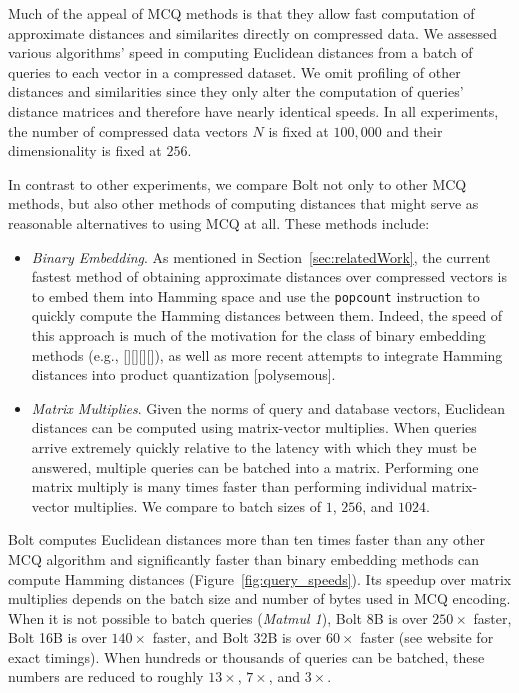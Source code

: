 Much of the appeal of MCQ methods is that they allow fast computation of approximate distances and similarites directly on compressed data. We assessed various algorithms' speed in computing Euclidean distances from a batch of queries to each vector in a compressed dataset. We omit profiling of other distances and similarities since they only alter the computation of queries' distance matrices and therefore have nearly identical speeds. In all experiments, the number of compressed data vectors $N$ is fixed at $100,000$ and their dimensionality is fixed at $256$.

In contrast to other experiments, we compare Bolt not only to other MCQ methods, but also other methods of computing distances that might serve as reasonable alternatives to using MCQ at all. These methods include:
\begin{itemize}
    \item \textit{Binary Embedding}. As mentioned in Section~\ref{sec:relatedWork}, the current fastest method of obtaining approximate distances over compressed vectors is to embed them into Hamming space and use the \texttt{popcount} instruction to quickly compute the Hamming distances between them. Indeed, the speed of this approach is much of the motivation for the class of binary embedding methods (e.g., [][][][]), as well as more recent attempts to integrate Hamming distances into product quantization [polysemous].
    \item \textit{Matrix Multiplies}. Given the norms of query and database vectors, Euclidean distances can be computed using matrix-vector multiplies. When queries arrive extremely quickly relative to the latency with which they must be answered, multiple queries can be batched into a matrix. Performing one matrix multiply is many times faster than performing individual matrix-vector multiplies. We compare to batch sizes of $1$, $256$, and $1024$.
\end{itemize}

Bolt computes Euclidean distances more than ten times faster than any other MCQ algorithm and significantly faster than binary embedding methods can compute Hamming distances (Figure~\ref{fig:query_speeds}). Its speedup over matrix multiplies depends on the batch size and number of bytes used in MCQ encoding. When it is not possible to batch queries (\textit{Matmul 1}), Bolt 8B is over $250\times$ faster, Bolt 16B is over $140\times$ faster, and Bolt 32B is over $60\times$ faster (see website for exact timings). When hundreds or thousands of queries can be batched, these numbers are reduced to roughly $13\times$, $7\times$, and $3\times$.

